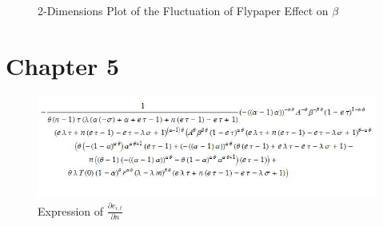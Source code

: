 \begin{figure}[H]
    \centering
    \caption{2-Dimensions Plot of the Fluctuation of Flypaper Effect on $\beta$}
    \label{febeta}
\end{figure}
\clearpage
\section{Chapter 5}

\begin{figure}[H]
    \centering
    \includegraphics[scale=0.8]{Chapter-5/Figures/calculation effortttt.JPG}
    \caption[Expression of $\frac{\partial e_{i,t}}{\partial n}$]{Expression of $\frac{\partial e_{i,t}}{\partial n}$
        \texttt{} }
    \label{enenen}
\end{figure}

